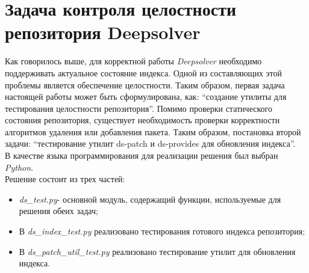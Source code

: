 \section{Задача контроля целостности репозитория Deepsolver}
Как говорилось выше, для корректной работы \textit{Deepsolver} необходимо
поддерживать актуальное состояние индекса. Одной из составляющих
этой проблемы является обеспечение целостности. Таким образом, первая
задача настоящей работы может быть сформулирована, как: ``создание
утилиты для тестирования целостности репозитория''.
Помимо проверки статического состояния репозитория, существует необходимость
проверки корректности алгоритмов удаления или добавления пакета. Таким образом,
постановка второй задачи: ``тестирование утилит ds-patch и ds-provides для обновления
индекса''.\\

В качестве языка программирования для реализации решения был выбран \textit{Python}.\\
Решение состоит из трех частей:\\
\begin{itemize}
\item{ \textit{ds\_test.py}- основной модуль, содержащий функции, используемые
для решения обеих задач;}
\item{ В \textit{ds\_index\_test.py} реализовано тестирования готового индекса репозитория;}
\item{ В \textit{ds\_patch\_util\_test.py} реализовано тестирование утилит для обновления
индекса.}
\end{itemize}

